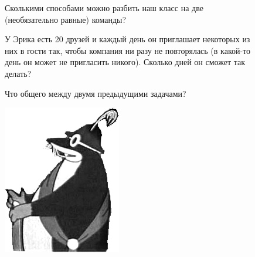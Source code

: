 \begin{figure}[H]
\begin{minipage}{0.75\linewidth}\setlength{\parindent}{1.5em}
    \begin{thm}
        Сколькими способами можно разбить наш класс на две (необязательно равные) команды?
    \end{thm}
    \begin{thm}
        У Эрика есть 20 друзей и каждый день он приглашает некоторых из них в гости так, чтобы компания ни разу не повторялась (в какой-то день он может не пригласить никого). Сколько дней он сможет так делать?
    \end{thm}
    \begin{ques}
        Что общего между двумя предыдущими задачами?
    \end{ques}
\end{minipage}
\hfill
\begin{minipage}{0.2\linewidth}
    \includegraphics[width=0.95\columnwidth]{img/9.0.1 krot.png}
\end{minipage}
\end{figure} 

